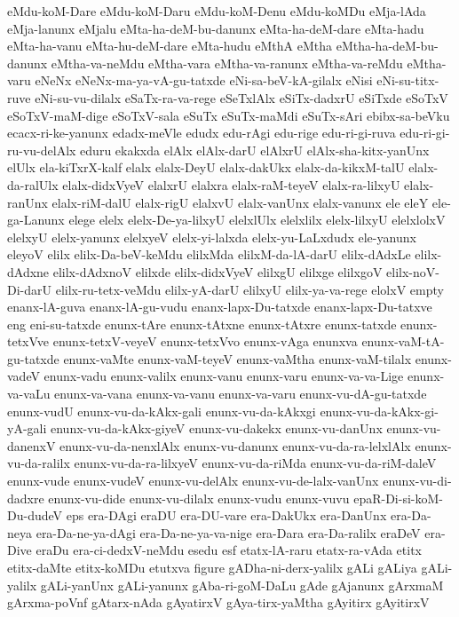 {eMdu-koM-Dare
eMdu-koM-Daru
eMdu-koM-Denu
eMdu-koMDu
eMja-lAda
eMja-lanunx
eMjalu
eMta-ha-deM-bu-danunx
eMta-ha-deM-dare
eMta-hadu
eMta-ha-vanu
eMta-hu-deM-dare
eMta-hudu
eMthA
eMtha
eMtha-ha-deM-bu-danunx
eMtha-va-neMdu
eMtha-vara
eMtha-va-ranunx
eMtha-va-reMdu
eMtha-varu
eNeNx
eNeNx-ma-ya-vA-gu-tatxde
eNi-sa-beV-kA-gilalx
eNisi
eNi-su-titx-ruve
eNi-su-vu-dilalx
eSaTx-ra-va-rege
eSeTxlAlx
eSiTx-dadxrU
eSiTxde
eSoTxV
eSoTxV-maM-dige
eSoTxV-sala
eSuTx
eSuTx-maMdi
eSuTx-sAri
ebibx-sa-beVku
ecacx-ri-ke-yanunx
edadx-meVle
edudx
edu-rAgi
edu-rige
edu-ri-gi-ruva
edu-ri-gi-ru-vu-delAlx
eduru
ekakxda
elAlx
elAlx-darU
elAlxrU
elAlx-sha-kitx-yanUnx
elUlx
ela-kiTxrX-kalf
elalx
elalx-DeyU
elalx-dakUkx
elalx-da-kikxM-talU
elalx-da-ralUlx
elalx-didxVyeV
elalxrU
elalxra
elalx-raM-teyeV
elalx-ra-lilxyU
elalx-ranUnx
elalx-riM-dalU
elalx-rigU
elalxvU
elalx-vanUnx
elalx-vanunx
ele
eleY
ele-ga-Lanunx
elege
elelx
elelx-De-ya-lilxyU
elelxlUlx
elelxlilx
elelx-lilxyU
elelxlolxV
elelxyU
elelx-yanunx
elelxyeV
elelx-yi-lalxda
elelx-yu-LaLxdudx
ele-yanunx
eleyoV
elilx
elilx-Da-beV-keMdu
elilxMda
elilxM-da-lA-darU
elilx-dAdxLe
elilx-dAdxne
elilx-dAdxnoV
elilxde
elilx-didxVyeV
elilxgU
elilxge
elilxgoV
elilx-noV-Di-darU
elilx-ru-tetx-veMdu
elilx-yA-darU
elilxyU
elilx-ya-va-rege
elolxV
empty
enanx-lA-guva
enanx-lA-gu-vudu
enanx-lapx-Du-tatxde
enanx-lapx-Du-tatxve
eng
eni-su-tatxde
enunx-tAre
enunx-tAtxne
enunx-tAtxre
enunx-tatxde
enunx-tetxVve
enunx-tetxV-veyeV
enunx-tetxVvo
enunx-vAga
enunxva
enunx-vaM-tA-gu-tatxde
enunx-vaMte
enunx-vaM-teyeV
enunx-vaMtha
enunx-vaM-tilalx
enunx-vadeV
enunx-vadu
enunx-valilx
enunx-vanu
enunx-varu
enunx-va-va-Lige
enunx-va-vaLu
enunx-va-vana
enunx-va-vanu
enunx-va-varu
enunx-vu-dA-gu-tatxde
enunx-vudU
enunx-vu-da-kAkx-gali
enunx-vu-da-kAkxgi
enunx-vu-da-kAkx-gi-yA-gali
enunx-vu-da-kAkx-giyeV
enunx-vu-dakekx
enunx-vu-danUnx
enunx-vu-danenxV
enunx-vu-da-nenxlAlx
enunx-vu-danunx
enunx-vu-da-ra-lelxlAlx
enunx-vu-da-ralilx
enunx-vu-da-ra-lilxyeV
enunx-vu-da-riMda
enunx-vu-da-riM-daleV
enunx-vude
enunx-vudeV
enunx-vu-delAlx
enunx-vu-de-lalx-vanUnx
enunx-vu-di-dadxre
enunx-vu-dide
enunx-vu-dilalx
enunx-vudu
enunx-vuvu
epaR-Di-si-koM-Du-dudeV
eps
era-DAgi
eraDU
era-DU-vare
era-DakUkx
era-DanUnx
era-Da-neya
era-Da-ne-ya-dAgi
era-Da-ne-ya-va-nige
era-Dara
era-Da-ralilx
eraDeV
era-Dive
eraDu
era-ci-dedxV-neMdu
esedu
esf
etatx-lA-raru
etatx-ra-vAda
etitx
etitx-daMte
etitx-koMDu
etutxva
figure
gADha-ni-derx-yalilx
gALi
gALiya
gALi-yalilx
gALi-yanUnx
gALi-yanunx
gAba-ri-goM-DaLu
gAde
gAjanunx
gArxmaM
gArxma-poVnf
gAtarx-nAda
gAyatirxV
gAya-tirx-yaMtha
gAyitirx
gAyitirxV
}
